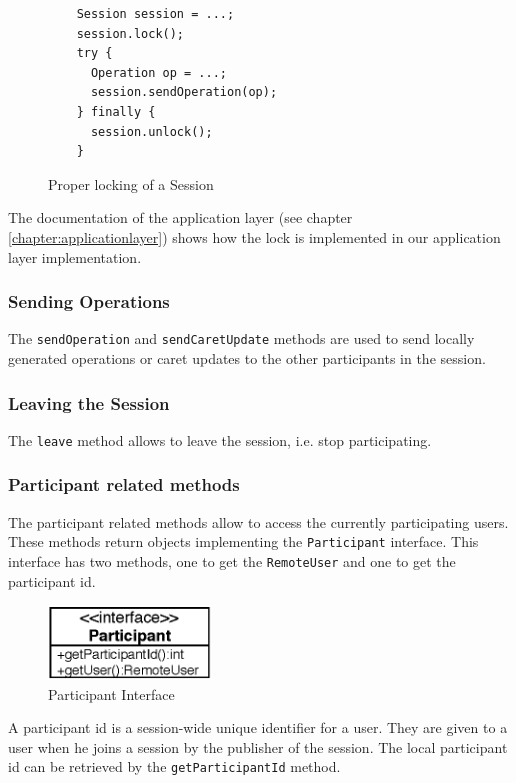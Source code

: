 \begin{figure}[H]
 \small{\begin{verbatim}
    Session session = ...;
    session.lock();
    try {
      Operation op = ...;
      session.sendOperation(op);
    } finally {
      session.unlock();
    }
 \end{verbatim}}
 \caption{Proper locking of a Session}
\end{figure}

The documentation of the application layer (see chapter 
\ref{chapter:applicationlayer}) 
shows how the lock is implemented in our application layer implementation.


\subsubsection{Sending Operations}
The \texttt{send\-Operation} and \texttt{send\-Caret\-Update} 
methods are used to send locally generated operations or
caret updates to the other participants in the session. 

\subsubsection{Leaving the Session}
The \texttt{leave} method allows to leave the session, i.e. stop participating. 

\subsubsection{Participant related methods}
The participant
related methods allow to access the currently participating users. These
methods return objects implementing the \texttt{Participant} interface. This
interface has two methods, one to get the \texttt{Remote\-User} and one to get 
the participant id.

\begin{figure}[H]
 \centering
 \includegraphics[width=4.34cm,height=1.98cm]{../images/finalreport/architecture_participant_uml.eps}
 \caption{Participant Interface}
\end{figure}

A participant id is a session-wide unique identifier for a user. They are given
to a user when he joins a session by the publisher of the session. The local
participant id can be retrieved by the \texttt{get\-Participant\-Id} method.


